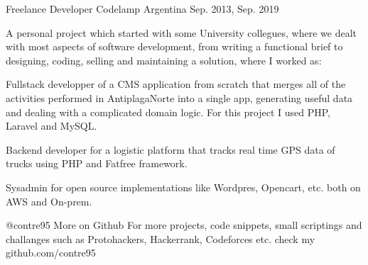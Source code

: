

\begin{cventries}
 \cventry
 {Freelance Developer} %
 {Codelamp} %
 {Argentina} %
 {Sep. 2013, Sep. 2019} %
 {
   {A personal project which started with some University collegues, where we dealt with most aspects of software development, from writing a functional brief to designing, coding, selling and maintaining a solution, where I worked as: }
   \linebreak
  \begin{cvitems}
    \item {Fullstack developper of a CMS application from scratch that merges all of the activities performed in AntiplagaNorte into a single app, generating useful data and dealing with a complicated domain logic. For this project I used PHP, Laravel and MySQL.}
    \item {Backend developer for a logistic platform that tracks real time GPS data of trucks using PHP and Fatfree framework.}
    \item {Sysadmin for open source implementations like Wordpres, Opencart, etc. both on AWS and On-prem.}
  \end{cvitems}
}

  \cventry
      {@contre95} %
      {More on Github} %
      {} %
      {} %
      {For more projects, code snippets, small scriptings and challanges such as Protohackers, Hackerrank, Codeforces etc. check my github.com/contre95}

\end{cventries}
